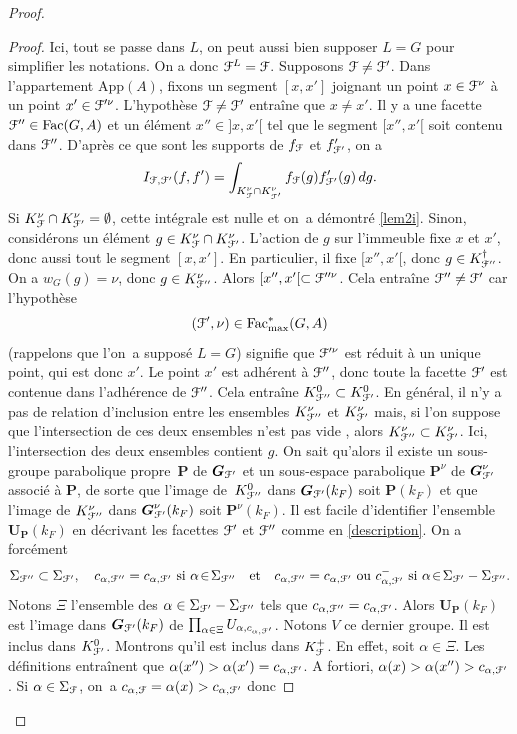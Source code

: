 \documentclass[11pt]{article}
\numberwithin{equation}{section}\providecommand{\og}{«\,}\providecommand{\fg}{\,»}
\let\mathcal \EuScript
\newcommand{\quadet}{\quad\text{et}\quad}
\newcommand{\App}{\mathrm{App}}
\newcommand{\Fac}{\mathrm{Fac}}
\newcommand{\bG}{\boldsymbol{G}}
\newcommand{\bP}{\boldsymbol{P}}
\newcommand{\bU}{\boldsymbol{U}}
\newcommand{\cF}{\mathcal{F}}
\theoremstyle{plain}
\theoremstyle{definition}
\begin{document}
\begin{proof}
\begin{proof}
Ici, tout se passe dans $L$, on peut aussi bien supposer $L=G$ pour simplifier les notations. On a donc $\cF^L=\cF$. Supposons $\cF\neq\cF'$. Dans l'appartement $\App(A)$, fixons
un segment $[x,x']$ joignant un point $x\in \cF^{\nu}$ à un point $x'\in \cF^{\prime\nu}$. L'hypothèse $\cF\neq\cF'$ entraîne que $x\neq x'$. Il y a une facette $\cF''\in \Fac(G,A)$ et un élément $x''\in{}]x,x'[$ tel que le segment $[x'',x'[$ soit contenu dans $\cF''$. D'après ce que sont les supports de $f_{\cF}$ et $f'_{\cF'}$, on a
\[
I_{\cF,\cF'}(f,f')=\int_{K_{\cF}^{\nu}\cap K_{\cF'}^{\nu}}f_{\cF}(g)f'_{\cF'}(g)\, dg.
\]
Si $K_{\cF}^{\nu}\cap K_{\cF'}^{\nu}=\emptyset$, cette intégrale est nulle et on~a démontré \eqref{lem2i}. Sinon, considérons un élément $g\in K_{\cF}^{\nu}\cap K_{\cF'}^{\nu}$. L'action de $g$ sur l'immeuble fixe $x$ et $x'$, donc aussi tout le segment $[x,x']$. En particulier, il fixe $[x'',x'[$, donc $g\in K_{\cF''}^{\dag}$. On a $w_{G}(g)=\nu$, donc $g\in K_{\cF''}^{\nu}$. Alors $[x'',x'[\subset \cF^{\prime\prime\nu}$. Cela entraîne $\cF''\neq\cF'$ car l'hypothèse
\[
(\cF',\nu)\in \Fac^*_{\max}(G,A)
\]
(rappelons que l'on~a supposé $L=G$) signifie que $\cF^{\prime\nu}$ est réduit à un unique point, qui est donc $x'$. Le point $x'$ est adhérent à $\cF''$, donc toute la facette $\cF'$ est contenue dans l'adhérence de $\cF''$. Cela entraîne $K_{\cF''}^0\subset K_{\cF'}^0$. En général, il n'y a pas de relation d'inclusion entre les ensembles $K_{\cF''}^{\nu}$ et $K_{\cF'}^{\nu}$ mais, si l'on suppose que l'intersection de ces deux ensembles n'est pas vide , alors $K_{\cF''}^{\nu}\subset K_{\cF'}^{\nu}$. Ici, l'intersection des deux ensembles contient $g$.
On sait qu'alors il existe un sous-groupe parabolique propre~$\bP$ de $\bG_{\cF'}$ et un sous-espace parabolique $\bP^{\nu}$ de $\bG_{\cF'}^{\nu}$ associé à $\bP$, de sorte que l'image de~$K_{\cF''}^{0}$ dans $\bG_{\cF'}(k_{F})$ soit $\bP(k_{F})$ et que l'image de $K_{\cF''}^{\nu} $ dans $\bG_{\cF'}^{\nu}(k_{F})$ soit $\bP^{\nu}(k_{F})$. Il est facile d'identifier l'ensemble $\bU_{\bP}(k_{F})$ en décrivant les facettes $\cF'$ et $\cF''$ comme en \ref{description}. On a forcément
\[
\Sigma_{\cF''}\subset \Sigma_{\cF'},\quad c_{\alpha,\cF''}=c_{\alpha,\cF'}\text{ si }\alpha\!\in\!\Sigma_{\cF''}\quadet c_{\alpha,\cF''}=c_{\alpha,\cF'}\text{ ou }c_{\alpha,\cF'}^-\text{ si }\alpha\!\in\!\Sigma_{\cF'}-\Sigma_{\cF''}.
\]
Notons $\Xi$ l'ensemble des $\alpha\in \Sigma_{\cF'}-\Sigma_{\cF''}$ tels que $c_{\alpha,\cF''}=c_{\alpha,\cF'}$. Alors $\bU_{\bP}(k_{F})$ est l'image dans $\bG_{\cF'}(k_{F})$ de $\prod_{\alpha\in \Xi}U_{\alpha,c_{\alpha,\cF'}}$. Notons $V$ ce dernier groupe. Il est inclus dans $K_{\cF'}^0$. Montrons qu'il est inclus dans $K_{\cF}^+$. En effet, soit $\alpha\in \Xi$. Les définitions entraînent que $\alpha(x'')> \alpha(x')=c_{\alpha,\cF'}$. A fortiori, $\alpha(x)> \alpha(x'')> c_{\alpha,\cF'}$. Si $\alpha\in \Sigma_{\cF}$, on~a $c_{\alpha,\cF}=\alpha(x)> c_{\alpha,\cF'}$ donc

\end{proof}
\end{proof}
\end{document}
